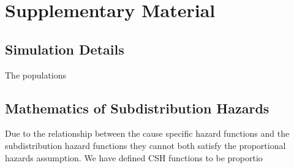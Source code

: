 \documentclass[
]{article}
\begin{document}
\hypertarget{chapConfCRsupp}{%
\section{Supplementary Material}\label{chapConfCRsupp}}

\hypertarget{simulation-details}{%
\subsection{Simulation Details}\label{simulation-details}}

The populations

\hypertarget{mathematics-of-subdistribution-hazards}{%
\subsection{Mathematics of Subdistribution Hazards}\label{mathematics-of-subdistribution-hazards}}

Due to the relationship between the cause specific hazard functions and the subdistribution hazard functions they cannot both satisfy the proportional hazards assumption. We have defined CSH functions to be proportio
\end{document}
